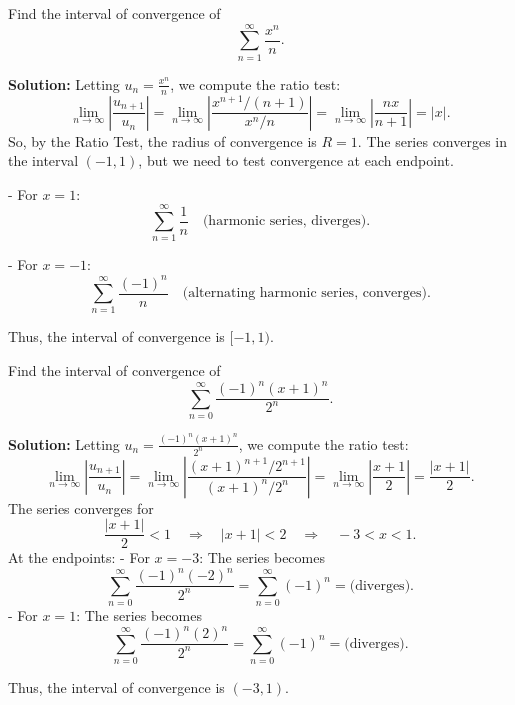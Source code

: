 \documentclass[12pt]{article}
\theoremstyle{beautifulthm}
\begin{document}
\newpage


\begin{tcolorbox}[colback=examplebg, colframe=red!75!black, title=\textbf{EXAMPLE 5: Finding the Interval of Convergence}, fonttitle=\bfseries, sharp corners]

Find the interval of convergence of 
\[
\sum_{n=1}^\infty \frac{x^n}{n}.
\]

\tcblower
\textbf{Solution:} 
Letting \( u_n = \frac{x^n}{n} \), we compute the ratio test:
\[
\lim_{n \to \infty} \left| \frac{u_{n+1}}{u_n} \right| = \lim_{n \to \infty} \left| \frac{x^{n+1}/(n+1)}{x^n/n} \right| = \lim_{n \to \infty} \left| \frac{nx}{n+1} \right| = |x|.
\]
So, by the Ratio Test, the radius of convergence is \( R = 1 \). The series converges in the interval \( (-1, 1) \), but we need to test convergence at each endpoint.

- For \( x = 1 \):
\[
\sum_{n=1}^\infty \frac{1}{n} \quad \text{(harmonic series, diverges).}
\]

- For \( x = -1 \):
\[
\sum_{n=1}^\infty \frac{(-1)^n}{n} \quad \text{(alternating harmonic series, converges).}
\]

Thus, the interval of convergence is \( [-1, 1) \).
\end{tcolorbox}




\begin{tcolorbox}[colback=examplebg, colframe=red!75!black, title=\textbf{EXAMPLE 6:  Finding the Interval of Convergence}, fonttitle=\bfseries, sharp corners]


Find the interval of convergence of 
\[
\sum_{n=0}^\infty \frac{(-1)^n (x+1)^n}{2^n}.
\]

\tcblower
\textbf{Solution:} 
Letting \( u_n = \frac{(-1)^n (x+1)^n}{2^n} \), we compute the ratio test:
\[
\lim_{n \to \infty} \left| \frac{u_{n+1}}{u_n} \right| = \lim_{n \to \infty} \left| \frac{(x+1)^{n+1}/2^{n+1}}{(x+1)^n/2^n} \right| = \lim_{n \to \infty} \left| \frac{x+1}{2} \right| = \frac{|x+1|}{2}.
\]
The series converges for 
\[
\frac{|x+1|}{2} < 1 \quad \Rightarrow \quad |x+1| < 2 \quad \Rightarrow \quad -3 < x < 1.
\]
At the endpoints:
- For \( x = -3 \): The series becomes 
\[
\sum_{n=0}^\infty \frac{(-1)^n (-2)^n}{2^n} = \sum_{n=0}^\infty (-1)^n = \text{(diverges).}
\]
- For \( x = 1 \): The series becomes 
\[
\sum_{n=0}^\infty \frac{(-1)^n (2)^n}{2^n} = \sum_{n=0}^\infty (-1)^n = \text{(diverges).}
\]

Thus, the interval of convergence is \( (-3, 1) \).
\end{tcolorbox}
\end{document}
